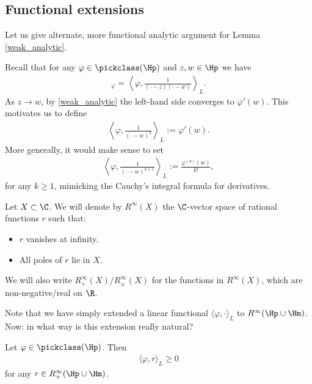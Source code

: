 \subsection{Functional extensions}

Let us give alternate, more functional analytic argument for Lemma \ref{weak_analytic}.

Recall that for any $\varphi \in \pickclass(\Hp)$ and $z, w \in \Hp$ we have
\begin{align*}
	[z, w]_{\varphi} = \left\langle \varphi, \frac{1}{(\cdot - z) (\cdot - w)} \right\rangle_{L}.
\end{align*}
As $z \to w$, by \ref{weak_analytic} the left-hand side converges to $\varphi'(w)$. This motivates us to define
\begin{align*}
	\left\langle \varphi, \frac{1}{(\cdot - w)^{2}} \right\rangle_{L} := \varphi'(w).
\end{align*}
More generally, it would make sense to set
\begin{align}\label{extension_formula}
	\left\langle \varphi, \frac{1}{(\cdot - w)^{k + 1}} \right\rangle_{L} := \frac{\varphi^{(k)}(w)}{k!},
\end{align}
for any $k \geq 1$, mimicking the Cauchy's integral formula for derivatives.

\begin{maar}
	Let $X \subset \C$. We will denote by $R^{\infty}(X)$ the $\C$-vector space of rational functions $r$ such that:
	\begin{itemize}
		\item $r$ vanishes at infinity.
		\item All poles of $r$ lie in $X$.
	\end{itemize}
	We will also write $R^{\infty}_{+}(X)/R^{\infty}_{\pm}(X)$ for the functions in $R^{\infty}(X)$, which are non-negative/real on $\R$.
\end{maar}

Note that we have simply extended a linear functional $\langle \varphi, \cdot\rangle_{L}$ to $R^{\infty}(\Hp \cup \Hm)$. Now: in what way is this extension really natural?

\begin{prop}\label{extension_positivity}
	Let $\varphi \in \pickclass(\Hp)$. Then
	\begin{align*}
		\langle \varphi, r\rangle_{L} \geq 0
	\end{align*}
	for any $r \in R_{+}^{\infty}(\Hp \cup \Hm)$.
\end{prop}

